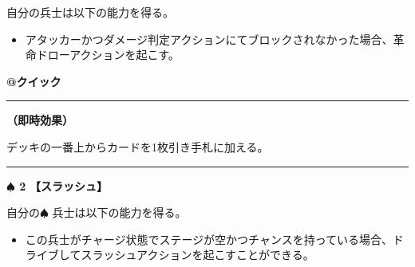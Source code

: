 \documentclass[twocolumn,a5paper,papersize,10pt]{jarticle}
\begin{document}
\vspace{1mm}%



自分の兵士は以下の能力を得る。


\vspace{-1zh}%
\begin{itemize}
\setlength{\leftskip}{-0.3cm}
\setlength{\parskip}{0pt} %

\item アタッカーかつダメージ判定アクションにてブロックされなかった場合、革命ドローアクションを起こす。
\vspace{-1zh}%
\end{itemize}

\begin{tcolorbox}[title={\small\bf【Action】革命ドロー}{\scriptsize （誘発）}]

{\scriptsize\bf @クイック }

\vspace{1mm} %
\hrule height 0.1mm depth 0mm width 62mm %
\vspace{1mm} %

{\bf（即時効果）}

デッキの一番上からカードを1枚引き手札に加える。

\vspace{1mm} %
\end{tcolorbox}

\vspace{-1zh}
  
 

\vspace{3mm} %
\hrule height 0.5mm depth 0mm width 66.5mm %
\vspace{1mm} %
{\Large\bf $\spadesuit$ 2} {\normalsize\bf【スラッシュ】} %
\vspace{1mm} %

自分の{\normalsize $\spadesuit$} 兵士は以下の能力を得る。


\vspace{-1zh}%
\begin{itemize}
\setlength{\leftskip}{-0.3cm}
\setlength{\parskip}{0pt} %

\item この兵士がチャージ状態でステージが空かつチャンスを持っている場合、ドライブしてスラッシュアクションを起こすことができる。
\vspace{-1zh}%
\end{itemize}
\end{document}
